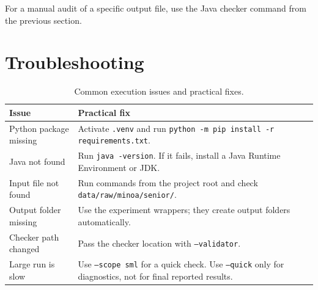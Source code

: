 For a manual audit of a specific output file, use the Java checker command from
the previous section.

\section{Troubleshooting}

\begin{table}[H]
\centering
\scriptsize
\caption{Common execution issues and practical fixes.}
\label{tab:appendix-troubleshooting}
\begin{tabularx}{\textwidth}{p{3.8cm}X}
\toprule
Issue & Practical fix \\
\midrule
Python package missing &
Activate \texttt{.venv} and run \texttt{python -m pip install -r requirements.txt}. \\
Java not found &
Run \texttt{java -version}. If it fails, install a Java Runtime Environment or JDK. \\
Input file not found &
Run commands from the project root and check \texttt{data/raw/minoa/senior/}. \\
Output folder missing &
Use the experiment wrappers; they create output folders automatically. \\
Checker path changed &
Pass the checker location with \texttt{--validator}. \\
Large run is slow &
Use \texttt{--scope sml} for a quick check. Use \texttt{--quick} only for diagnostics,
not for final reported results. \\
\bottomrule
\end{tabularx}
\end{table}
